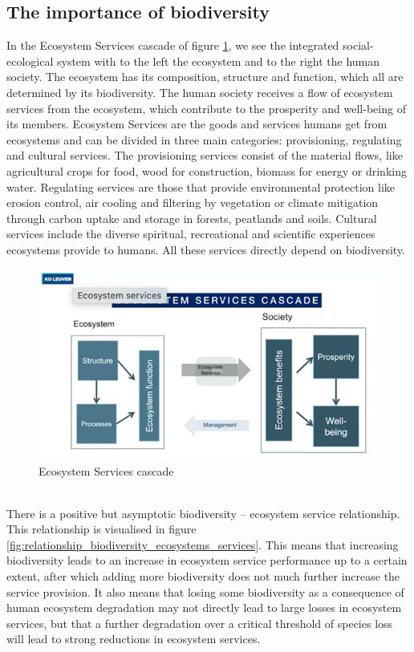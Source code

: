 \documentclass[../summary.tex]{subfiles}
\begin{document}
	\subsection{The importance of biodiversity}
	In the Ecosystem Services cascade of figure \ref{fig:ecosystems_services_cascade}, we see the integrated social-ecological system with to the left the ecosystem and to the right the human society. The ecosystem has its composition, structure and function, which all are determined by its biodiversity. The human society receives a flow of ecosystem services from the ecosystem, which contribute to the prosperity and well-being of its members. Ecosystem Services are the goods and services humans get from ecosystems and can be divided in three main categories: provisioning, regulating and cultural services. The provisioning services consist of the material flows, like agricultural crops for food, wood for construction, biomass for energy or drinking water. Regulating services are those that provide environmental protection like erosion control, air cooling and filtering by vegetation or climate mitigation through carbon uptake and storage in forests, peatlands and soils. Cultural services include the diverse spiritual, recreational and scientific experiences ecosystems provide to humans. All these services directly depend on biodiversity.
	\begin{figure}[htbp]
		\centering
		\includegraphics[width=1\linewidth]{images/2-ecosystem-services-cascade.png}
		\caption{Ecosystem Services cascade}
		\label{fig:ecosystems_services_cascade}
	\end{figure}
	\\
	There is a positive but asymptotic biodiversity – ecosystem service relationship. This relationship is visualised in figure \ref{fig:relationship_biodiversity_ecosystems_services}. This means that increasing biodiversity leads to an increase in ecosystem service performance up to a certain extent, after which adding more biodiversity does not much further increase the service provision. It also means that losing some biodiversity as a consequence of human ecosystem degradation may not directly lead to large losses in ecosystem services, but that a further degradation over a critical threshold of species loss will lead to strong reductions in ecosystem services.
\end{document}
